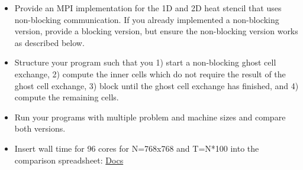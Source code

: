 \documentclass[UTF-8]{article}
\begin{document}
    \begin{itemize}
    	\item Provide an MPI implementation for the 1D and 2D heat stencil that uses non-blocking communication. If you already implemented a non-blocking version, provide a blocking version, but ensure the non-blocking version works as described below.
    	\item Structure your program such that you 1) start a non-blocking ghost cell exchange, 2) compute the inner cells which do not require the
    	result of the ghost cell exchange, 3) block until the ghost cell exchange has finished, and 4) compute the remaining cells.
    	\item Run your programs with multiple problem and machine sizes and compare both versions.
    	\item Insert wall time for 96 cores for N=768x768 and T=N*100 into the comparison spreadsheet: \href{https://docs.google.com/spreadsheets/d/1p6d9F12EtykmI2-7MnHkg0U15UAtaCvWz8Ip92ZEsWo}{Docs}
    \end{itemize}
\end{document}
